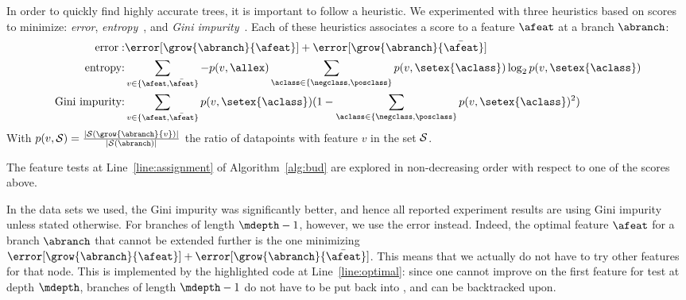 \documentclass{llncs}
\begin{document}
In order to quickly find highly accurate trees, it is important to follow a heuristic. We experimented with three heuristics based on scores to minimize: \emph{error}, \emph{entropy}~\cite{10.1023/A:1022643204877}, and \emph{Gini impurity}~\cite{breiman1984classification}. 
Each of these heuristics associates a score to a feature $\afeat$ at a branch $\abranch$:
\begin{eqnarray}
	\textrm{error}: & \error[\grow{\abranch}{\afeat}] + \error[\grow{\abranch}{\bar{\afeat}}] \\
	\textrm{entropy:} & \sum\limits_{v \in \{\afeat,\bar{\afeat}\}} -p(v,\allex) \sum\limits_{\aclass \in \{\negclass,\posclass\}} p(v,\setex{\aclass}) \log_{2} p(v,\setex{\aclass}) \\
	\textrm{Gini impurity:} &  \sum\limits_{v \in \{\afeat,\bar{\afeat}\}} p(v,\setex{\aclass})(1 - \sum\limits_{\aclass \in \{\negclass,\posclass\}} p(v,\setex{\aclass})^2)
\end{eqnarray}
With $p(v,{\cal S}) = \frac{|{\cal S}(\grow{\abranch}{v})|}{|{\cal S}(\abranch)|}$ the ratio of datapoints with feature $v$ in the set ${\cal S}$.

The feature tests at Line~\ref{line:assignment} of Algorithm~\ref{alg:bud} are explored in non-decreasing order with respect to one of the scores above.


In the data sets we used, the Gini impurity was significantly better, and hence all reported experiment results are using Gini impurity unless stated otherwise. For branches of length $\mdepth-1$, however, we use the error instead. Indeed, the optimal feature $\afeat$ for a branch $\abranch$ that cannot be extended further is the one minimizing 
$\error[\grow{\abranch}{\afeat}] + \error[\grow{\abranch}{\bar{\afeat}}]$.
This means that we actually do not have to try other features for that node. This is implemented by the highlighted code at Line~\ref{line:optimal}: since one cannot improve on the first feature for test at depth $\mdepth$, branches of length $\mdepth-1$ do not have to be put back into \bud, and can be backtracked upon.
\end{document}

